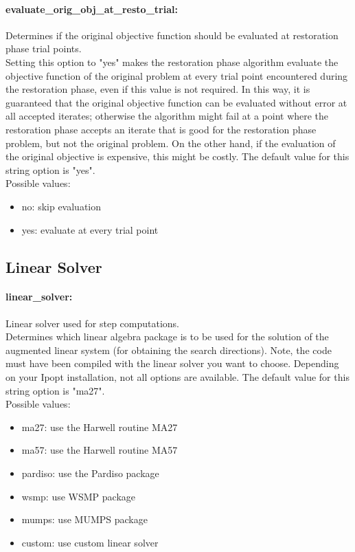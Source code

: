 \paragraph{evaluate\_orig\_obj\_at\_resto\_trial:}\label{sec:evaluate_orig_obj_at_resto_trial} Determines if the original objective function should be evaluated at restoration phase trial points. $\;$ \\
 Setting this option to "yes" makes the
restoration phase algorithm evaluate the
objective function of the original problem at
every trial point encountered during the
restoration phase, even if this value is not
required.  In this way, it is guaranteed that the
original objective function can be evaluated
without error at all accepted iterates; otherwise
the algorithm might fail at a point where the
restoration phase accepts an iterate that is good
for the restoration phase problem, but not the
original problem.  On the other hand, if the
evaluation of the original objective is
expensive, this might be costly.
The default value for this string option is "yes".
\\ 
Possible values:
\begin{itemize}
   \item no: skip evaluation
   \item yes: evaluate at every trial point
\end{itemize}

\subsection{Linear Solver}

\paragraph{linear\_solver:}\label{sec:linear_solver} Linear solver used for step computations. $\;$ \\
 Determines which linear algebra package is to be
used for the solution of the augmented linear
system (for obtaining the search directions).
Note, the code must have been compiled with the
linear solver you want to choose. Depending on
your Ipopt installation, not all options are
available.
The default value for this string option is "ma27".
\\ 
Possible values:
\begin{itemize}
   \item ma27: use the Harwell routine MA27
   \item ma57: use the Harwell routine MA57
   \item pardiso: use the Pardiso package
   \item wsmp: use WSMP package
   \item mumps: use MUMPS package
   \item custom: use custom linear solver
\end{itemize}

